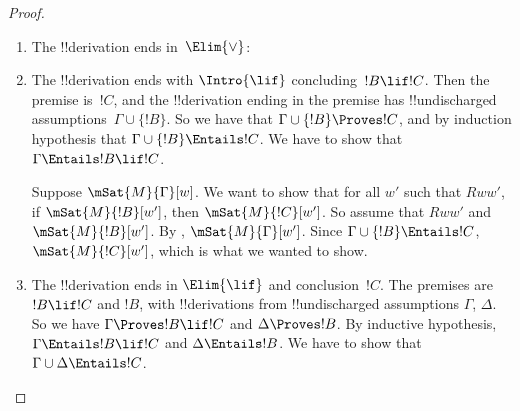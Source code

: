 \documentclass[../../../include/open-logic-section]{subfiles}
\begin{document}
\begin{proof}
\begin{enumerate}
  \item The !!{derivation} ends in~$\Elim{\lor}$:

  \item The !!{derivation} ends with $\Intro{\lif}$ concluding~$!B\lif
    !C$. Then the premise is~$!C$, and the !!{derivation} ending in
    the premise has !!{undischarged} assumptions~$\Gamma \cup
    \{!B\}$. So we have that $\Gamma \cup \{!B\} \Proves !C$, and by
    induction hypothesis that $\Gamma \cup \{!B\} \Entails !C$. We
    have to show that $\Gamma \Entails !B \lif !C$.

    Suppose $\mSat{M}{\Gamma}[w]$. We want to show that for all
    $w'$ such that $Rww'$, if $\mSat{M}{!B}[w']$, then
    $\mSat{M}{!C}[w']$. So assume that $Rww'$ and
    $\mSat{M}{!B}[w']$. By ,
    $\mSat{M}{\Gamma}[w']$. Since $\Gamma \cup \{!B\} \Entails !C$,
    $\mSat{M}{!C}[w']$, which is what we wanted to show. 

  \item The !!{derivation} ends in $\Elim{\lif}$ and
    conclusion~$!C$. The premises are $!B \lif !C$ and $!B$, with
    !!{derivation}s from !!{undischarged} assumptions $\Gamma$,
    $\Delta$. So we have $\Gamma \Proves !B \lif !C$ and $\Delta
    \Proves !B$. By inductive hypothesis, $\Gamma \Entails !B \lif !C$
    and $\Delta \Entails !B$. We have to show that $\Gamma \cup \Delta
    \Entails !C$.


\end{enumerate}
\end{proof}
\end{document}
